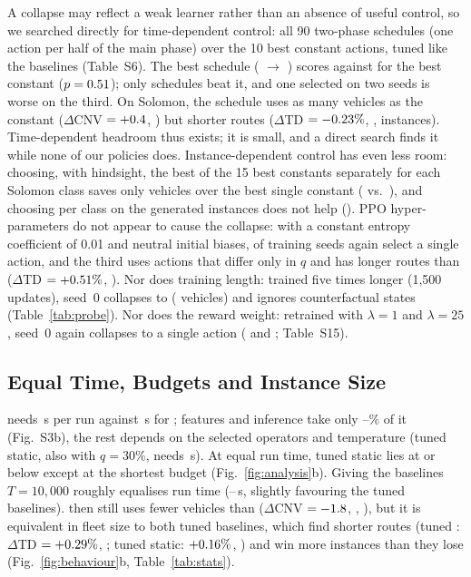 A collapse may reflect a weak learner rather than an absence of useful control, so we
searched directly for time-dependent control: all 90 two-phase schedules (one action
per half of the main phase) over the 10 best constant actions, tuned like the
baselines (Table~S6). The best schedule (\vdhA{} $\rightarrow$ \vdhB{}) scores
\vdhDyn{} against \vdhConst{} for the best constant ($p=0.51{}$); only \vdhBeat{}
schedules beat it, and one selected on two seeds is worse on the third. On Solomon, the schedule uses as many vehicles as the constant
($\Delta$CNV $=+0.4{}$, \rhSchedpNVt{}) but shorter routes ($\Delta$TD
$=-0.23{}\%$, \rhSchedpTDt{}, \rhSchednTD{} instances). %
Time-dependent headroom thus exists; it is small, and a direct search finds it while
none of our policies does. Instance-dependent control has even less room: choosing, with
hindsight, the best of the 15 best constants separately for each Solomon class saves only
\qOrGain{} vehicles over the best single constant (\qOrClassCnv{} vs.\ \qOrSingleCnv{}),
and choosing per class on the generated instances does not help (\qOrSelCnv{}). %
PPO hyper-parameters do not appear to cause the collapse: with a constant entropy
coefficient of 0.01 and neutral initial biases, \qEntOne{} of \qEntN{} training seeds
again select a single action, and the third uses \ventN{} actions that differ only in $q$
and has longer routes than \Rw{} ($\Delta$TD $=+0.51{}\%$, \rhEntRwpTDt{}). Nor does
training length: trained five times longer (1{,}500 updates), seed~0 collapses to
\qLongAct{} (\qLongCnv{} vehicles) and ignores counterfactual states (Table~\ref{tab:probe}). Nor does the reward weight: retrained with
$\lambda=1$ and $\lambda=25$, seed~0 again collapses to a single action
(\qLamOneAct{} and \qLamTfAct{}; Table~S15). %

\subsection{Equal Time, Budgets and Instance Size}\label{sec:budgets}

\sgalns{} needs \rtimeSg{}\,s per run against \rtimeRw{}\,s for \Rw{}; features and
inference take only \xpolShareSg{}--\xpolShareCtx{}\% of it (Fig.~S3b), the rest
depends on the selected operators and temperature (tuned static, also with $q=30\%$,
needs \rtimeSt{}\,s). At equal run time, tuned static lies
at or below \sgalns{} except at the shortest budget (Fig.~\ref{fig:analysis}b).
Giving the baselines $T=10{,}000$ roughly equalises run time (\xtmTimeRw{}--\xtmTimeRwt{}\,s,
slightly favouring the tuned baselines). \sgalns{} then still uses fewer vehicles than
\Rw{} ($\Delta$CNV $=-1.8{}$, \rstRwTmpNVt{}, \rstRwTmpNVholmt{}), but it is
equivalent in fleet size to both tuned baselines, which find shorter routes (tuned \Rw{}: $\Delta$TD
$=+0.29{}\%$, \rstRwtTmpTDt{}; tuned static: $+0.16{}\%$,
\rstStTmpTDt{}) and win more instances than they lose (Fig.~\ref{fig:behaviour}b,
Table~\ref{tab:stats}). %

